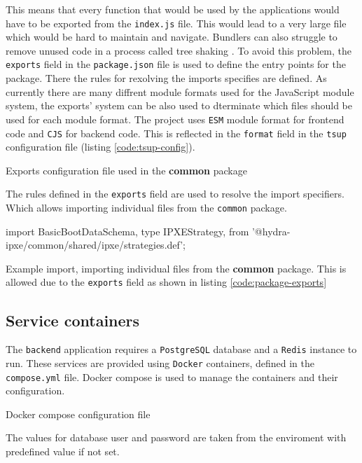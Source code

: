 \documentclass[../main.tex]{subfiles}
\begin{document}
This means that every function that would be used by the applications would have to be exported from the \texttt{index.js} file.
This would lead to a very large file which would be hard to maintain and navigate. Bundlers can also struggle to remove unused code in a process called tree shaking \cite{tree-shaking}.
To avoid this problem, the \texttt{exports} field in the \texttt{package.json} file is used to define the entry points for the package.
There the rules for rexolving the imports specifies are defined. As currently there are many diffrent module formats used for the JavaScript module system,
the exports' system can be also used to dterminate which files should be used for each module format. The project uses \texttt{ESM} \cite{esm} module format for frontend code and \texttt{CJS} \cite{cjs} for backend code.
This is reflected in the \texttt{format} field in the \texttt{tsup} configuration file (listing \ref{code:tsup-config}).

\begin{listing}[H]
  \caption{Exports configuration file used in the \textbf{common} package}
  \label{code:package-exports}
\end{listing}

The rules defined in the \texttt{exports} field are used to resolve the import specifiers. Which allows importing individual files from the \texttt{common} package.

\begin{listing}[H]
  \begin{tscode}
    import {
    BasicBootDataSchema,
    type IPXEStrategy,
    } from '@hydra-ipxe/common/shared/ipxe/strategies.def';
  \end{tscode}
  \caption{Example import, importing individual files from the \textbf{common} package. This is allowed due to the \texttt{exports} field as shown in listing \ref{code:package-exports}}
\end{listing}

\subsection{Service containers}

The \texttt{backend} application requires a \texttt{PostgreSQL} database and a \texttt{Redis} instance to run.
These services are provided using \texttt{Docker} containers, defined in the \texttt{compose.yml} file.
Docker compose \cite{docker-compose} is used to manage the containers and their configuration.

\begin{listing}[H]
  \caption{Docker compose configuration file}
\end{listing}

The values for database user and password are taken from the enviroment with predefined value if not set.
\end{document}
